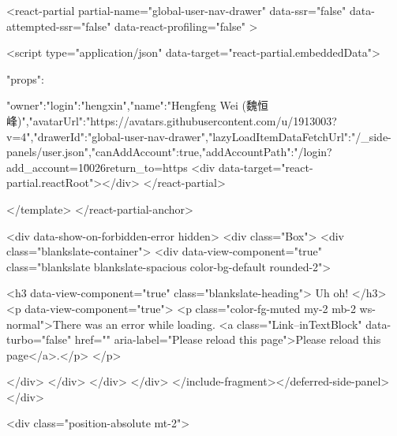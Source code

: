 <react-partial
  partial-name="global-user-nav-drawer"
  data-ssr="false"
  data-attempted-ssr="false"
  data-react-profiling="false"
>
  
  <script type="application/json" data-target="react-partial.embeddedData">{"props":{"owner":{"login":"hengxin","name":"Hengfeng Wei (魏恒峰)","avatarUrl":"https://avatars.githubusercontent.com/u/1913003?v=4"},"drawerId":"global-user-nav-drawer","lazyLoadItemDataFetchUrl":"/_side-panels/user.json","canAddAccount":true,"addAccountPath":"/login?add_account=1\u0026return_to=https%
  <div data-target="react-partial.reactRoot"></div>
</react-partial>


  </template>
</react-partial-anchor>


  <div data-show-on-forbidden-error hidden>
    <div class="Box">
  <div class="blankslate-container">
    <div data-view-component="true" class="blankslate blankslate-spacious color-bg-default rounded-2">
      

      <h3 data-view-component="true" class="blankslate-heading">        Uh oh!
</h3>
      <p data-view-component="true">        <p class="color-fg-muted my-2 mb-2 ws-normal">There was an error while loading. <a class="Link--inTextBlock" data-turbo="false" href="" aria-label="Please reload this page">Please reload this page</a>.</p>
</p>

</div>  </div>
</div>  </div>
</include-fragment></deferred-side-panel>
        </div>

        <div class="position-absolute mt-2">
            
}}
